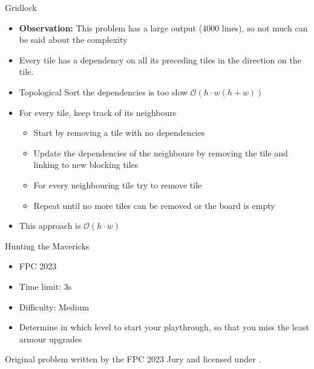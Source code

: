 \documentclass[11pt,pdf, aspectratio=169]{beamer}
\begin{document}
  \begin{frame}{Gridlock}
    \begin{itemize}
      \item<1-> \textbf{Observation:} This problem has a large output (4000 lines), so not much can be said about the complexity
      \item<2-> Every tile has a dependency on all its preceding tiles in the direction on the tile.
      \item<2-> Topological Sort the dependencies is too slow $\mathcal{O}(h\cdot w(h+w))$
      \item<3-> For every tile, keep track of its neighbours
      \begin{itemize}
        \item<4-> Start by removing a tile with no dependencies
        \item<4-> Update the dependencies of the neighbours by removing the tile and linking to new blocking tiles
        \item<4-> For every neighbouring tile try to remove tile
        \item<4-> Repeat until no more tiles can be removed or the board is empty
      \end{itemize}
      \item<5-> This approach is $\mathcal{O}(h\cdot w)$
    \end{itemize}
  \end{frame}
  \begin{frame}{Hunting the Mavericks}
    \begin{itemize}
      \item FPC 2023
      \item Time limit: 3s
      \item Difficulty: Medium
      \item Determine in which level to start your playthrough, so that you miss the least armour upgrades
    \end{itemize}
    Original problem written by the FPC 2023 Jury and licensed under \doclicenseLongNameRef.

    \doclicenseImage

  \end{frame}
\end{document}
